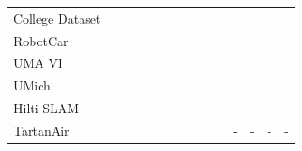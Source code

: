 \documentclass[10pt,twocolumn,letterpaper]{article}
\newcommand{\cc}{\color[rgb]{0,0.6,0.3}\checkmark}
\newcommand{\xx}{\color[rgb]{0.6,0,0}{\ding{55}}}
\begin{document}
\begin{table}[h!]
\begin{center}
{\begin{tabular}{l|cccc|ccccc|cccc|}
           
			College Dataset~\cite{zhang2021multi}   & \cc & \cc & \cc & \xx & \xx & \xx & \xx & \xx & \xx & \xx & \xx & \xx & \cc\\
			RobotCar \cite{maddern20171}            & \cc & \cc & \cc & \xx & \cc & \xx & \cc & \xx & \xx & \cc & \xx & \xx & \xx\\
            
            UMA VI~\cite{zuniga2020vi}              & \cc & \cc & \xx & \xx & \cc & \xx & \cc & \xx & \xx & \xx & \xx & \xx & \cc \\
            UMich~\cite{carlevaris2016university}   & \cc & \cc & \cc & \xx & \cc & \xx & \xx & \xx & \xx & \cc & \xx & \xx & \cc \\ %
            
            Hilti SLAM~\cite{helmberger2022hilti}   & \cc & \cc & \cc & \xx & \cc & \xx & \cc & \xx & \xx & \xx & \cc & \xx & \cc \\
            TartanAir~\cite{tartanair2020iros}      & \cc & \cc & \cc & \xx & \cc & \cc & \cc & \xx & \cc &  -  &  -  &  -  &  -  \\


\end{tabular}}
\end{center}
\end{table}
\end{document}
